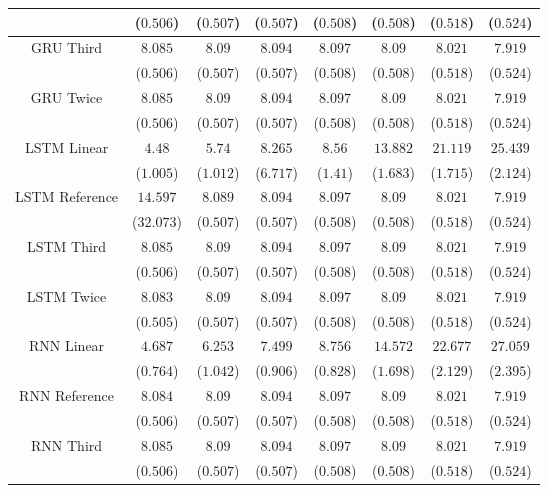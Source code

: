 \begin{table}[!ht]
{\begin{tabular}{|c|c|c|c|c|c|c|c|}
			 & ($0.506$) & ($0.507$) & ($0.507$) & ($0.508$) & ($0.508$) & ($0.518$) & ($0.524$) \\ \hline
			\multirow{2}{*}{GRU Third} & $8.085$ & $8.09$ & $8.094$ & $8.097$ & $8.09$ & $8.021$ & $7.919$ \\
			 & ($0.506$) & ($0.507$) & ($0.507$) & ($0.508$) & ($0.508$) & ($0.518$) & ($0.524$) \\ \hline
			\multirow{2}{*}{GRU Twice} & $8.085$ & $8.09$ & $8.094$ & $8.097$ & $8.09$ & $8.021$ & $7.919$ \\
			 & ($0.506$) & ($0.507$) & ($0.507$) & ($0.508$) & ($0.508$) & ($0.518$) & ($0.524$) \\ \hline
			\multirow{2}{*}{LSTM Linear} & $4.48$ & $5.74$ & $8.265$ & $8.56$ & $13.882$ & $21.119$ & $25.439$ \\
			 & ($1.005$) & ($1.012$) & ($6.717$) & ($1.41$) & ($1.683$) & ($1.715$) & ($2.124$) \\ \hline
			\multirow{2}{*}{LSTM Reference} & $14.597$ & $8.089$ & $8.094$ & $8.097$ & $8.09$ & $8.021$ & $7.919$ \\
			 & ($32.073$) & ($0.507$) & ($0.507$) & ($0.508$) & ($0.508$) & ($0.518$) & ($0.524$) \\ \hline
			\multirow{2}{*}{LSTM Third} & $8.085$ & $8.09$ & $8.094$ & $8.097$ & $8.09$ & $8.021$ & $7.919$ \\
			 & ($0.506$) & ($0.507$) & ($0.507$) & ($0.508$) & ($0.508$) & ($0.518$) & ($0.524$) \\ \hline
			\multirow{2}{*}{LSTM Twice} & $8.083$ & $8.09$ & $8.094$ & $8.097$ & $8.09$ & $8.021$ & $7.919$ \\
			 & ($0.505$) & ($0.507$) & ($0.507$) & ($0.508$) & ($0.508$) & ($0.518$) & ($0.524$) \\ \hline
			\multirow{2}{*}{RNN Linear} & $4.687$ & $6.253$ & $7.499$ & $8.756$ & $14.572$ & $22.677$ & $27.059$ \\
			 & ($0.764$) & ($1.042$) & ($0.906$) & ($0.828$) & ($1.698$) & ($2.129$) & ($2.395$) \\ \hline
			\multirow{2}{*}{RNN Reference} & $8.084$ & $8.09$ & $8.094$ & $8.097$ & $8.09$ & $8.021$ & $7.919$ \\
			 & ($0.506$) & ($0.507$) & ($0.507$) & ($0.508$) & ($0.508$) & ($0.518$) & ($0.524$) \\ \hline
			\multirow{2}{*}{RNN Third} & $8.085$ & $8.09$ & $8.094$ & $8.097$ & $8.09$ & $8.021$ & $7.919$ \\
			 & ($0.506$) & ($0.507$) & ($0.507$) & ($0.508$) & ($0.508$) & ($0.518$) & ($0.524$) \\ \hline

\end{tabular}}
\end{table}
